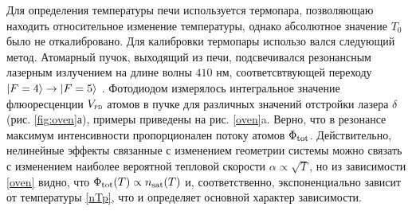 Для определения температуры печи используется термопара, позволяющаю находить относительное изменение температуры, однако абсолютное значение $T_0$ было не откалибровано. Для калибровки термопары использо вался следующий метод. Атомарный пучок, выходящий из печи, подсвечивался резонансным лазерным излучением на длине волны $410$ нм, соответсвтвующей переходу $\left| F=4 \right\rangle \to \left| F=5 \right\rangle$ \cite{vlad}. Фотодиодом измерялось интегральное значение флюоресценции  $\subt{V}{PD}$ атомов в пучке для различных значений отстройки лазера $\delta$ (рис. \ref{fig:oven}а), примеры приведены на рис. \ref{oven}a. Верно, что в резонансе максимум интенсивности пропорционален потоку атомов $\Phi_{\textnormal{tot}}$. Действительно, нелинейные эффекты связанные с изменением геометрии системы можно связать с изменением наиболее вероятной тепловой скорости $\alpha \propto \sqrt{T}$, но из зависимости \eqref{oven} видно, что $\Phi_{\textnormal{tot}}(T) \propto n_{\textnormal{sat}}(T)$ и, соответственно, экспоненциально зависит от температуры \eqref{nTp}, что и определяет основной характер зависимости. 


